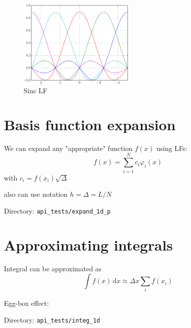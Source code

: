 \begin{figure}[h]
{\centering
\includegraphics[width=0.5\textwidth]{../../api_tests/plot_1d/LF1d_sinc.pdf}
\par}
\caption{Sinc LF}\label{fig:LF1d_sinc_5}
\end{figure}


\section{Basis function expansion}

We can expand any "appropriate" function $f(x)$ using LFs:
\begin{equation}
f(x) = \sum_{i=1}^{N} c_{i} \varphi_{i}(x)
\end{equation}
with $c_{i} = f(x_{i}) \sqrt{\Delta}$

also can use notation $h = \Delta = L/N$

Directory: \texttt{api\_tests/expand\_1d\_p}





\section{Approximating integrals}

Integral can be approximated as
\begin{equation}
\int f(x)\,\mathrm{d}x \approx \Delta x \sum_{i} f(x_{i})
\end{equation}

Egg-box effect:

Directory: \texttt{api\_tests/integ\_1d}
